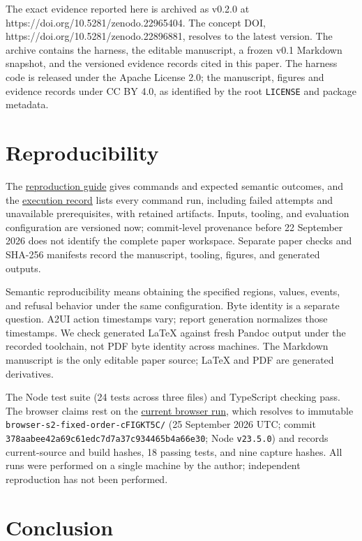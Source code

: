 \documentclass[11pt]{article}
\begin{document}
The exact evidence reported here is archived as v0.2.0 at
https://doi.org/10.5281/zenodo.22965404. The concept DOI,
https://doi.org/10.5281/zenodo.22896881, resolves to the latest version.
The archive contains the harness, the editable manuscript, a frozen v0.1
Markdown snapshot, and the versioned evidence records cited in this
paper. The harness code is released under the Apache License 2.0; the
manuscript, figures and evidence records under CC BY 4.0, as identified
by the root \texttt{LICENSE} and package metadata.

\section{Reproducibility}\label{reproducibility}

The \href{./REPRODUCTION.md}{reproduction guide} gives commands and
expected semantic outcomes, and the \href{./EXECUTION.md}{execution
record} lists every command run, including failed attempts and
unavailable prerequisites, with retained artifacts. Inputs, tooling, and
evaluation configuration are versioned now; commit-level provenance
before 22 September 2026 does not identify the complete paper workspace.
Separate paper checks and SHA-256 manifests record the manuscript,
tooling, figures, and generated outputs.

Semantic reproducibility means obtaining the specified regions, values,
events, and refusal behavior under the same configuration. Byte identity
is a separate question. A2UI action timestamps vary; report generation
normalizes those timestamps. We check generated LaTeX against fresh
Pandoc output under the recorded toolchain, not PDF byte identity across
machines. The Markdown manuscript is the only editable paper source;
LaTeX and PDF are generated derivatives.

The Node test suite (24 tests across three files) and TypeScript
checking pass. The browser claims rest on the
\href{./evidence/current-browser-run/}{current browser run}, which
resolves to immutable \texttt{browser-s2-fixed-order-cFIGKT5C/} (25
September 2026 UTC; commit
\texttt{378aabee42a69c61edc7d7a37c934465b4a66e30}; Node
\texttt{v23.5.0}) and records current-source and build hashes, 18
passing tests, and nine capture hashes. All runs were performed on a
single machine by the author; independent reproduction has not been
performed.

\section{Conclusion}\label{conclusion}
\end{document}
